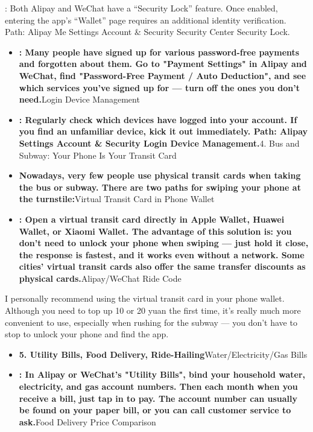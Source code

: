 : Both Alipay and WeChat have a “Security Lock” feature. Once enabled, entering the app's “Wallet” page requires an additional identity verification. Path: Alipay Me Settings Account \& Security Security Center Security Lock.


\begin{itemize}
  \item \textbf{: Many people have signed up for various password-free payments and forgotten about them. Go to "Payment Settings" in Alipay and WeChat, find "Password-Free Payment / Auto Deduction", and see which services you've signed up for — turn off the ones you don't need.}Login Device Management
  \item \textbf{: Regularly check which devices have logged into your account. If you find an unfamiliar device, kick it out immediately. Path: Alipay Settings Account \& Security Login Device Management.}4. Bus and Subway: Your Phone Is Your Transit Card
  \item \textbf{Nowadays, very few people use physical transit cards when taking the bus or subway. There are two paths for swiping your phone at the turnstile:}Virtual Transit Card in Phone Wallet
  \item \textbf{: Open a virtual transit card directly in Apple Wallet, Huawei Wallet, or Xiaomi Wallet. The advantage of this solution is: you don't need to unlock your phone when swiping — just hold it close, the response is fastest, and it works even without a network. Some cities' virtual transit cards also offer the same transfer discounts as physical cards.}Alipay/WeChat Ride Code
\end{itemize}


I personally recommend using the virtual transit card in your phone wallet. Although you need to top up 10 or 20 yuan the first time, it's really much more convenient to use, especially when rushing for the subway — you don't have to stop to unlock your phone and find the app.

\begin{itemize}
  \item \textbf{5. Utility Bills, Food Delivery, Ride-Hailing}Water/Electricity/Gas Bills
  \item \textbf{: In Alipay or WeChat's "Utility Bills", bind your household water, electricity, and gas account numbers. Then each month when you receive a bill, just tap in to pay. The account number can usually be found on your paper bill, or you can call customer service to ask.}Food Delivery Price Comparison
\end{itemize}

